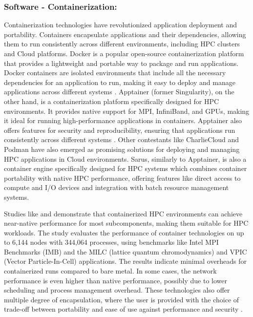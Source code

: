     \subsubsection{Software - Containerization:} Containerization technologies have revolutionized application deployment and portability. Containers encapsulate applications and their dependencies, allowing them to run consistently across different environments, including HPC clusters and Cloud platforms. Docker is a popular open-source containerization platform that provides a lightweight and portable way to package and run applications. Docker containers are isolated environments that include all the necessary dependencies for an application to run, making it easy to deploy and manage applications across different systems \cite{beserra_performance_2015, cho_possibility_2019, kuity_investigating_2023}. Apptainer (former Singularity), on the other hand, is a containerization platform specifically designed for HPC environments. It provides native support for MPI, InfiniBand, and GPUs, making it ideal for running high-performance applications in containers. Apptainer also offers features for security and reproducibility, ensuring that applications run consistently across different systems \cite{roy_mashup_2022, petrosyan_serverless_2022, elisseev_multiscale_2022, zhou_containerisation_2023, ruhela_characterizing_2021}. Other contestants like CharlieCloud and Podman have also emerged as promising solutions for deploying and managing HPC applications in Cloud environments. Sarus, similarly to Apptainer, is also a container engine specifically designed for HPC systems which combines container portability with native HPC performance, offering features like direct access to compute and I/O devices and integration with batch resource management systems.  \cite{copik_rfaas_2023, benedicic_sarus_2019}

    Studies like \cite{ruhela_characterizing_2021} and \cite{kuity_investigating_2023} demonstrate that containerized HPC environments can achieve near-native performance for most subcomponents, making them suitable for HPC workloads. The study evaluates the performance of container technologies on up to 6,144 nodes with 344,064 processes, using benchmarks like Intel MPI Benchmarks (IMB) and the MILC (lattice quantum chromodynamics) and VPIC (Vector Particle-In-Cell) applications. The results indicate minimal overheads for containerized runs compared to bare metal. In some cases, the network performance is even higher than native performance, possibly due to lower scheduling and process management overhead. These technologies also offer multiple degree of encapsulation, where the user is provided with the choice of trade-off between portability and ease of use against performance and security \cite{kuity_investigating_2023, cho_possibility_2019, ruhela_characterizing_2021}.


